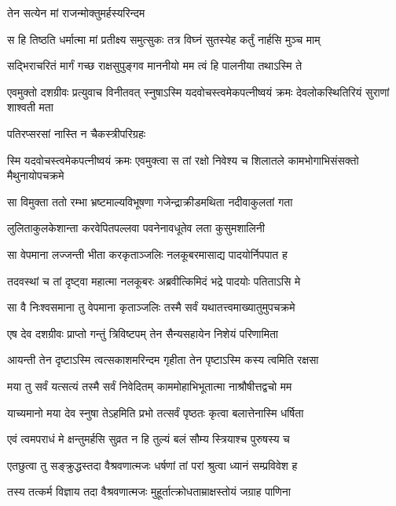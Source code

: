 \onelineshloka
{तेन सत्येन मां राजन्मोक्तुमर्हस्यरिन्दम} %

\twolineshloka
{स हि तिष्ठति धर्मात्मा मां प्रतीक्ष्य समुत्सुकः}
{तत्र विघ्नं सुतस्येह कर्तुं नार्हसि मुञ्च माम्} %

\twolineshloka
{सद्भिराचरितं मार्गं गच्छ राक्षसुपुङ्गव}
{माननीयो मम त्वं हि पालनीया तथाऽस्मि ते} %

\threelineshloka
{एवमुक्तो दशग्रीवः प्रत्युवाच विनीतवत्}
{स्नुषाऽस्मि यदवोचस्त्वमेकपत्नीष्वयं क्रमः}
{देवलोकस्थितिरियं सुराणां शाश्वती मता} %

\onelineshloka
{पतिरप्सरसां नास्ति न चैकस्त्रीपरिग्रहः} %

\threelineshloka
{स्मि यदवोचस्त्वमेकपत्नीष्वयं क्रमः}
{एवमुक्त्वा स तां रक्षो निवेश्य च शिलातले}
{कामभोगाभिसंसक्तो मैथुनायोपचक्रमे} %

\twolineshloka
{सा विमुक्ता ततो रम्भा भ्रष्टमाल्यविभूषणा}
{गजेन्द्राक्रीडमथिता नदीवाकुलतां गता} %

\twolineshloka
{लुलिताकुलकेशान्ता करवेपितपल्लवा}
{पवनेनावधूतेव लता कुसुमशालिनी} %

\twolineshloka
{सा वेपमाना लज्जन्ती भीता करकृताञ्जलिः}
{नलकूबरमासाद्य पादयोर्निपपात ह} %

\twolineshloka
{तदवस्थां च तां दृष्ट्वा महात्मा नलकूबरः}
{अब्रवीत्किमिदं भद्रे पादयोः पतिताऽसि मे} %

\twolineshloka
{सा वै निःश्वसमाना तु वेपमाना कृताञ्जलिः}
{तस्मै सर्वं यथातत्त्वमाख्यातुमुपचक्रमे} %

\twolineshloka
{एष देव दशग्रीवः प्राप्तो गन्तुं त्रिविष्टपम्}
{तेन सैन्यसहायेन निशेयं परिणामिता} %

\twolineshloka
{आयन्ती तेन दृष्टाऽस्मि त्वत्सकाशमरिन्दम}
{गृहीता तेन पृष्टाऽस्मि कस्य त्वमिति रक्षसा} %

\twolineshloka
{मया तु सर्वं यत्सत्यं तस्मै सर्वं निवेदितम्}
{काममोहाभिभूतात्मा नाश्रौषीत्तद्वचो मम} %

\twolineshloka
{याच्यमानो मया देव स्नुषा तेऽहमिति प्रभो}
{तत्सर्वं पृष्ठतः कृत्वा बलात्तेनास्मि धर्षिता} %

\twolineshloka
{एवं त्वमपराधं मे क्षन्तुमर्हसि सुव्रत}
{न हि तुल्यं बलं सौम्य स्त्रियाश्च पुरुषस्य च} %

\twolineshloka
{एतछुत्वा तु सङ्क्रुद्धस्तदा वैश्रवणात्मजः}
{धर्षणां तां परां श्रुत्वा ध्यानं सम्प्रविवेश ह} %

\twolineshloka
{तस्य तत्कर्म विज्ञाय तदा वैश्रवणात्मजः}
{मुहूर्तात्क्रोधताम्राक्षस्तोयं जग्राह पाणिना} %

